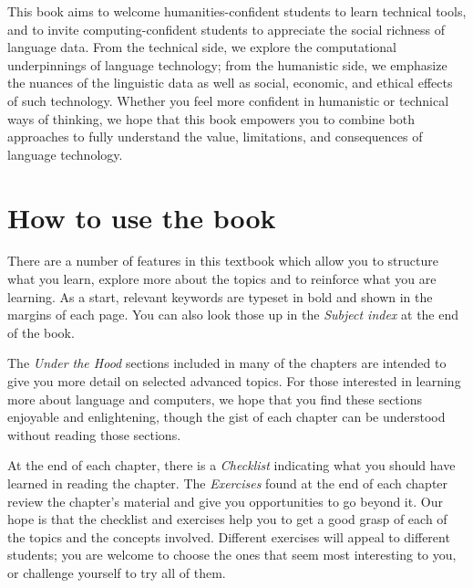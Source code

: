 This book aims to welcome humanities-confident students to learn technical tools, and to invite computing-confident students to appreciate the social richness of language data.    From the technical side, we explore the computational underpinnings of language technology; from the humanistic side, we emphasize the nuances of the linguistic data as well as social, economic, and ethical effects of such technology.  Whether you feel more confident in humanistic or technical ways of thinking, we hope that this book empowers you to combine both approaches to fully understand the value, limitations, and consequences of language technology.


\section*{How to use the book}

There are a number of features in this textbook which allow you to
structure what you learn, explore more about the topics and to
reinforce what you are learning.  As a start, relevant keywords are typeset in bold and shown in
the margins of each page. You can also look those up in the
\emph{Subject index} at the end of the book.

The \emph{Under the Hood} sections included in many of the chapters
are intended to give you more detail on selected advanced topics.  For
those interested in learning more about language and computers, we
hope that you find these sections enjoyable and enlightening, though
the gist of each chapter can be understood without reading those
sections.

At the end of each chapter, there is a \emph{Checklist} indicating
what you should have learned in reading the chapter.  The
\emph{Exercises} found at the end of each chapter review the
chapter's material and give you opportunities to go beyond it.  Our
hope is that the checklist and exercises help you to get a good grasp
of each of the topics and the concepts involved.  Different exercises will appeal to different students; you are welcome to choose the ones that seem most interesting to you, or challenge yourself to try all of them. 

